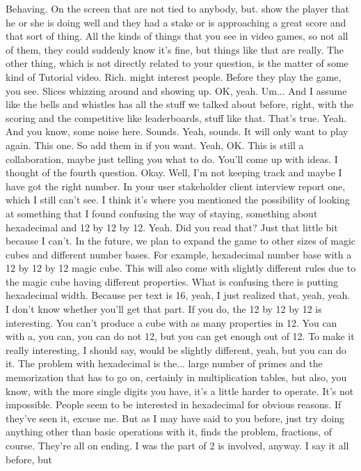 \documentclass{article}
\begin{document}
Behaving.
On the screen that are not tied to anybody, but.
show the player that he or she is doing well and they had a stake or is approaching a great score and that sort of thing. All the kinds of things that you see in video games, so not all of them, they could suddenly know it's fine, but things like that are really. The other thing, which is not directly related to your question,
is the matter of some kind of
Tutorial video.
Rich.
might interest people.
Before they play the game, you see.
Slices whizzing around and showing up. OK, yeah.
Um...
And I assume like the bells and whistles has all the stuff we talked about before, right, with the scoring and the competitive like leaderboards, stuff like that. That's true. Yeah. And you know, some noise here. Sounds. Yeah, sounds.
It will only want to play again.
This one. So add them in if you want. Yeah, OK.
This is still a collaboration, maybe just telling you what to do. You'll come up with ideas.
I thought of the fourth question. Okay. Well, I'm not keeping track and maybe I have got the right number. In your user stakeholder client interview report one, which I still can't see.
I think it's where you mentioned the possibility of looking at something that I found confusing the way of staying, something about hexadecimal and 12 by 12 by 12.
Yeah. Did you read that? Just that little bit because I can't. In the future, we plan to expand the game to other sizes of magic cubes and different number bases. For example, hexadecimal number base with a 12 by 12 by 12 magic cube. This will also come with slightly different rules due to the magic cube having different properties.
What is confusing there is putting hexadecimal width.
Because per text is 16, yeah, I just realized that, yeah, yeah.
I don't know whether you'll get that part. If you do, the 12 by 12 by 12 is interesting. You can't produce a cube with as many properties in 12. You can with a, you can, you can do not 12, but you can get enough out of 12.
To make it really interesting, I should say, would be slightly different, yeah, but you can do it. The problem with hexadecimal is the...
large number of primes and the memorization that has to go on, certainly in multiplication tables, but also, you know, with the more single digits you have, it's a little harder to operate. It's not impossible.
People seem to be interested in hexadecimal for obvious reasons. If they've seen it, excuse me.
But as I may have said to you before, just try doing anything other than basic operations with it, finds the problem, fractions, of course.
They're all on ending. I was the part of 2 is involved, anyway. I say it all before, but
\end{document}
